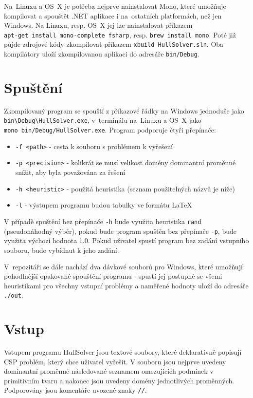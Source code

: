 \documentclass[thesis=B,czech]{FITthesis}[2012/06/26]
\theoremstyle{definition}
\begin{document}
Na~Linuxu a OS~X je potřeba nejprve nainstalovat Mono, které umožňuje kompilovat a spouštět .NET aplikace i na~ostatních platformách, než jen Windows. Na Linuxu, resp. OS~X jej lze nainstalovat příkazem \\ \verb|apt-get install mono-complete fsharp|, resp. \verb|brew install mono|. Poté již půjde zdrojové kódy zkompilovat příkazem \verb|xbuild HullSolver.sln|. Oba kompilátory uloží zkompilovanou aplikaci do adresáře \verb|bin/Debug|.

\section{Spuštění}

Zkompilovaný program se spouští z příkazové řádky na Windows jednoduše jako \verb|bin\Debug\HullSolver.exe|, v~terminálu na~Linuxu a OS~X jako \\ \verb|mono bin/Debug/HullSolver.exe|. Program podporuje čtyři přepínače:

\begin{itemize}
    \item \verb|-f <path>| - cesta k souboru s problémem k vyřešení
    \item \verb|-p <precision>| - kolikrát se musí velikost domény dominantní proměnné snížit, aby byla považována za řešení
    \item \verb|-h <heuristic>| - použitá heuristika (seznam použitelných názvů je níže)
    \item \verb|-l| - výstupem programu budou tabulky ve formátu \LaTeX
\end{itemize}

V případě spuštění bez přepínače \verb|-h| bude využita heuristika \verb|rand| (pseudonáhodný výběr), pokud bude program spuštěn bez přepínače \verb|-p|, bude využita výchozí hodnota 1.0. Pokud uživatel spustí program bez zadání vstupního souboru, bude vybídnut k jeho zadání.

V~repozitáři se dále nachází dva dávkové souborů pro Windows, které umožňují pohodlnější opakované spouštění programu - spustí jej postupně se všemi heuristikami pro všechny vstupní problémy a naměřené hodnoty uloží do adresáře \verb|./out|.

\section{Vstup}
Vstupem programu HullSolver jsou textové soubory, které deklarativně popisují CSP problém, který chce uživatel vyřešit. V souboru jsou nejprve uvedeny dominantní proměnné následované seznamem omezujících podmínek v primitivním tvaru a nakonec jsou uvedeny domény jednotlivých proměnných. Podporovány jsou komentáře uvozené znaky \verb|//|.
\end{document}

